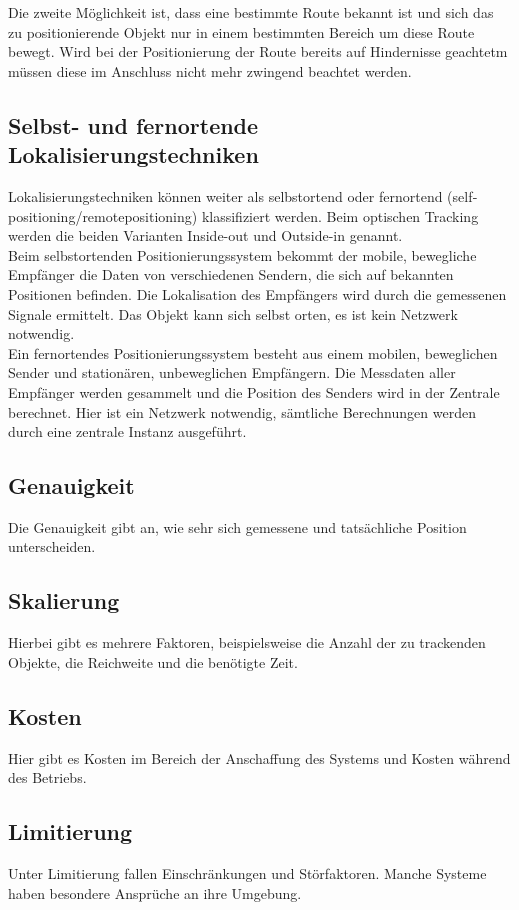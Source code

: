     Die zweite Möglichkeit ist, dass eine bestimmte Route bekannt ist und sich das zu positionierende Objekt nur in einem bestimmten Bereich um diese Route bewegt.
    Wird bei der Positionierung der Route bereits auf Hindernisse geachtetm müssen diese im Anschluss nicht mehr zwingend beachtet werden.

    \subsection*{Selbst- und fernortende Lokalisierungstechniken}
    Lokalisierungstechniken können weiter als selbstortend oder fernortend (self­positioning/remote­positioning) klassifiziert werden. Beim optischen Tracking werden die beiden Varianten Inside-out und Outside-in genannt.\\
    Beim selbstortenden Positionierungssystem bekommt der mobile, bewegliche Empfänger die Daten von verschiedenen Sendern, die sich auf bekannten Positionen befinden. Die Lokalisation des Empfängers wird durch die gemessenen Signale ermittelt. Das Objekt kann sich selbst orten, es ist kein Netzwerk notwendig.\\
    Ein fernortendes Positionierungssystem besteht aus einem mobilen, beweglichen Sender und stationären, unbeweglichen Empfängern. Die Messdaten aller Empfänger werden gesammelt und die Position des Senders wird in der Zentrale berechnet. Hier ist ein Netzwerk notwendig, sämtliche Berechnungen werden durch eine zentrale Instanz ausgeführt.


    \subsection*{Genauigkeit}
    Die Genauigkeit gibt an, wie sehr sich gemessene und tatsächliche Position unterscheiden.

    \subsection*{Skalierung}
    Hierbei gibt es mehrere Faktoren, beispielsweise die Anzahl der zu trackenden Objekte, die Reichweite und die benötigte Zeit.

    \subsection*{Kosten}
    Hier gibt es Kosten im Bereich der Anschaffung des Systems und Kosten während des Betriebs.

    \subsection*{Limitierung}
    Unter Limitierung fallen Einschränkungen und Störfaktoren. Manche Systeme haben besondere Ansprüche an ihre Umgebung.

